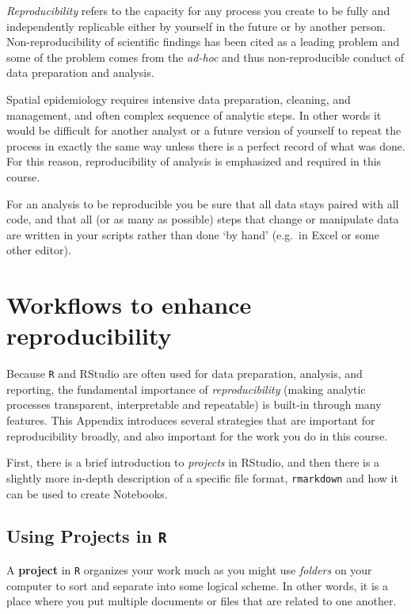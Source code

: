 \documentclass[
]{book}
\begin{document}
\emph{Reproducibility} refers to the capacity for any process you create to be fully and independently replicable either by yourself in the future or by another person. Non-reproducibility of scientific findings has been cited as a leading problem and some of the problem comes from the \emph{ad-hoc} and thus non-reproducible conduct of data preparation and analysis.

Spatial epidemiology requires intensive data preparation, cleaning, and management, and often complex sequence of analytic steps. In other words it would be difficult for another analyst or a future version of yourself to repeat the process in exactly the same way unless there is a perfect record of what was done. For this reason, reproducibility of analysis is emphasized and required in this course.

For an analysis to be reproducible you be sure that all data stays paired with all code, and that all (or as many as possible) steps that change or manipulate data are written in your scripts rather than done `by hand' (e.g.~in Excel or some other editor).

\hypertarget{workflows-to-enhance-reproducibility}{%
\section{Workflows to enhance reproducibility}\label{workflows-to-enhance-reproducibility}}

Because \texttt{R} and RStudio are often used for data preparation, analysis, and reporting, the fundamental importance of \emph{reproducibility} (making analytic processes transparent, interpretable and repeatable) is built-in through many features. This Appendix introduces several strategies that are important for reproducibility broadly, and also important for the work you do in this course.

First, there is a brief introduction to \emph{projects} in RStudio, and then there is a slightly more in-depth description of a specific file format, \texttt{rmarkdown} and how it can be used to create Notebooks.

\hypertarget{using-projects-in-r}{%
\subsection{\texorpdfstring{Using Projects in \texttt{R}}{Using Projects in R}}\label{using-projects-in-r}}

A \textbf{project} in \texttt{R} organizes your work much as you might use \emph{folders} on your computer to sort and separate into some logical scheme. In other words, it is a place where you put multiple documents or files that are related to one another.
\end{document}

